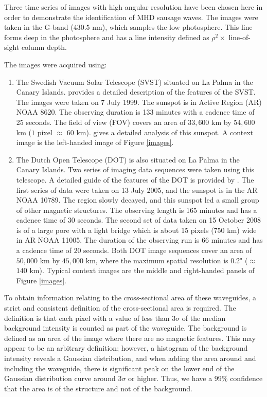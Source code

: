 	Three time series of images with high angular resolution have been chosen here in order to demonstrate the identification of MHD sausage waves.
	The images were taken in the G-band ($430.5$ nm), which samples the low photosphere.
	This line forms deep in the photosphere and has a line intensity defined as $\rho{^2} \times$ line-of-sight column depth.
	
	The images were acquired using:

	\begin{enumerate}
		\item 
			The Swedish Vacuum Solar Telescope (SVST) situated on La Palma in the Canary Islands.
			\citet{scharmer} provides a detailed description of the features of the SVST.
			The images were taken on 7 July 1999.
			The sunspot is in Active Region (AR) NOAA 8620.
			The observing duration is 133 minutes with a cadence time of 25 seconds.
			The field of view (FOV) covers an area of $33,600$ km by $54,600$ km ($1$ pixel $\approx$ $60$ km). \citet{bonet} gives a detailed analysis of this sunspot.
			A context image is the left-handed image of Figure \ref{images}.
		\item 
			The Dutch Open Telescope (DOT) is also situated on La Palma in the Canary Islands.
			Two series of imaging data sequences were taken using this telescope.
			A detailed guide of the features of the DOT is  provided by \citet{rutten}.
			The first series of data were taken on 13 July 2005, and the sunspot is in the AR NOAA 10789.
			The region slowly decayed, and this sunspot led a small group of other magnetic structures.
			The observing length is 165 minutes and has a cadence time of $30$ seconds.
			The second set of data taken on 15 October 2008 is of a large pore with a light bridge which is about 15 pixels (750 km) wide in AR NOAA 11005.
			The duration of the observing run is 66 minutes and has a cadence time of $20$ seconds.
			Both DOT image sequences cover an area of $50,000$ km by $45,000$ km, where the maximum spatial resolution is 0.2" ($\approx$ $140$ km).
			Typical context images are the middle and right-handed panels of Figure \ref{images}.
   \end{enumerate}
   
	To obtain information relating to the cross-sectional area of these waveguides, a strict and consistent definition of the cross-sectional area is required.
	The definition is that each pixel with a value of less than $3\sigma$ of the median background intensity is counted as part of the waveguide.
	The background is defined as an area of the image where there are no magnetic features.
	This may appear to be an arbitrary definition; however, a histogram of the background intensity reveals a Gaussian distribution, and when adding the area around and including the waveguide, there is significant peak on the lower end of the Gaussian distribution curve around 3$\sigma$ or higher.
	Thus, we have a $99\%$ confidence that the area is of the structure and not of the background.
	
